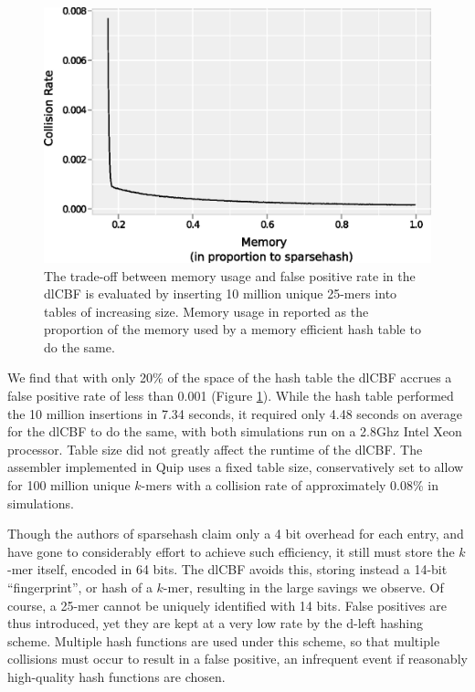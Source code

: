 \documentclass[a4,center,fleqn]{NAR}
\begin{document}
\begin{figure}[h]
\centerline{\includegraphics[width=\columnwidth]{dlcbf.eps}}
\caption{
The trade-off between memory usage and false positive rate in the dlCBF is
evaluated by inserting 10 million unique 25-mers into tables of increasing
size. Memory usage in reported as the proportion of the memory used by a
memory efficient hash table to do the same.
}
\label{fig:dlcbf_bench}
\end{figure}

We find that with only 20\% of the space of the hash table the dlCBF accrues a
false positive rate of less than 0.001 (Figure \ref{fig:dlcbf_bench}). While
the hash table performed the 10 million insertions in 7.34 seconds, it
required only 4.48 seconds on average for the dlCBF to do the same, with both
simulations run on a 2.8Ghz Intel Xeon processor. Table size did not greatly
affect the runtime of the dlCBF. The assembler implemented in Quip uses a
fixed table size, conservatively set to allow for 100 million unique $k$-mers
with a collision rate of approximately 0.08\% in simulations.

Though the authors of sparsehash claim only a 4 bit overhead for each entry,
and have gone to considerably effort to achieve such efficiency, it still must
store the $k$-mer itself, encoded in 64 bits. The dlCBF avoids this, storing
instead a 14-bit ``fingerprint'', or hash of a $k$-mer, resulting in the large
savings we observe. Of course, a 25-mer cannot be uniquely identified with 14
bits. False positives are thus introduced, yet they are kept at a very low
rate by the d-left hashing scheme. Multiple hash functions are used
under this scheme, so that multiple collisions must occur to result in a false
positive, an infrequent event if reasonably high-quality hash functions are
chosen.
\end{document}
